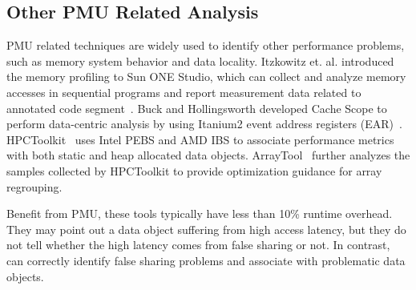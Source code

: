 \subsection{Other PMU Related Analysis}

PMU related techniques are widely used to identify other performance problems, such as memory system behavior and data locality. Itzkowitz et. al. introduced the memory profiling to Sun ONE Studio, which can collect and analyze memory accesses in sequential programs and report measurement data related to annotated code segment~\cite{DBLP:conf/sc/ItzkowitzWAK03}. Buck and Hollingsworth developed Cache Scope to perform data-centric analysis by using Itanium2 event address registers (EAR)~\cite{DBLP:conf/sc/BuckH04}. HPCToolkit~\cite{ibs-sc} uses Intel PEBS and AMD IBS to associate performance metrics with both static and heap allocated data objects. ArrayTool~\cite{ibs-pact} further analyzes the samples collected by HPCToolkit to provide optimization guidance for array regrouping. 

Benefit from PMU, these tools typically have less than 10\% runtime overhead. They may point out a data object suffering from high access latency, but they do not tell whether the high latency comes from false sharing or not. In contrast, \cheetah{} can correctly identify false sharing problems and associate with problematic data objects.





